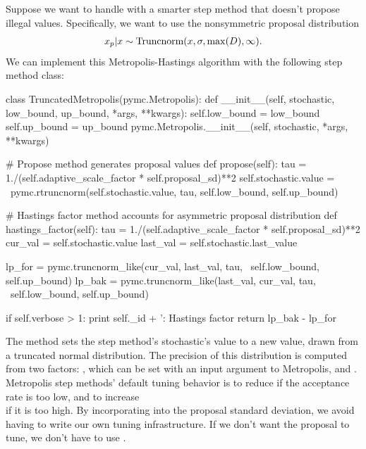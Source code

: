 \documentclass[]{jss}
\begin{document}
\medskip
Suppose we want to handle  with a smarter step method that doesn't propose illegal values. Specifically, we want to use the nonsymmetric proposal distribution
\begin{eqnarray*}
  x_p | x \sim \textup{Truncnorm}(x, \sigma, \max(D), \infty).
\end{eqnarray*}
We can implement this Metropolis-Hastings algorithm with the following step method class:
\begin{CodeInput}
class TruncatedMetropolis(pymc.Metropolis):
def __init__(self, stochastic, low_bound, up_bound, *args, **kwargs):
    self.low_bound = low_bound
    self.up_bound = up_bound
    pymc.Metropolis.__init__(self, stochastic, *args, **kwargs)

# Propose method generates proposal values
def propose(self):
    tau = 1./(self.adaptive_scale_factor * self.proposal_sd)**2
    self.stochastic.value = \
        pymc.rtruncnorm(self.stochastic.value, tau, self.low_bound, self.up_bound)

# Hastings factor method accounts for asymmetric proposal distribution
def hastings_factor(self):
    tau = 1./(self.adaptive_scale_factor * self.proposal_sd)**2
    cur_val = self.stochastic.value
    last_val = self.stochastic.last_value

    lp_for = pymc.truncnorm_like(cur_val, last_val, tau, \
        self.low_bound, self.up_bound)
    lp_bak = pymc.truncnorm_like(last_val, cur_val, tau, \
        self.low_bound, self.up_bound)

    if self.verbose > 1:
        print self._id + ': Hastings factor %
    return lp_bak - lp_for
\end{CodeInput}

The  method sets the step method's stochastic's value to a new value, drawn from a truncated normal distribution. The precision of this distribution is computed from two factors: , which can be set with an input argument to Metropolis, and . Metropolis step methods' default tuning behavior is to reduce  if the acceptance rate is too low, and to increase \\ if it is too high. By incorporating  into the proposal standard deviation, we avoid having to write our own tuning infrastructure. If we don't want the proposal to tune, we don't have to use .
\end{document}
